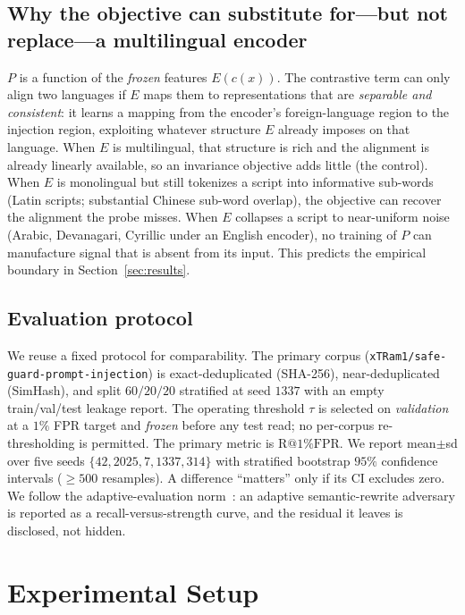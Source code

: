 \documentclass[pdflatex,sn-mathphys-num]{sn-jnl}
\makeatletter
\newcommand{\Rfpr}{\textrm{R@1\%FPR}}
\newcommand{\canon}{c}
\theoremstyle{plain}
\makeatother
\begin{document}
\subsection{Why the objective can substitute for---but not replace---a multilingual
encoder}\label{sec:method-boundary}
$P$ is a function of the \emph{frozen} features $E(\canon(x))$. The contrastive term
can only align two languages if $E$ maps them to representations that are
\emph{separable and consistent}: it learns a mapping from the encoder's
foreign-language region to the injection region, exploiting whatever structure $E$
already imposes on that language. When $E$ is multilingual, that structure is rich
and the alignment is already linearly available, so an invariance objective adds
little (the control). When $E$ is monolingual but still tokenizes a script into
informative sub-words (Latin scripts; substantial Chinese sub-word overlap), the
objective can recover the alignment the probe misses. When $E$ collapses a script to
near-uniform noise (Arabic, Devanagari, Cyrillic under an English encoder), no
training of $P$ can manufacture signal that is absent from its input. This predicts
the empirical boundary in Section~\ref{sec:results}.

\subsection{Evaluation protocol}\label{sec:protocol}
We reuse a fixed protocol for comparability. The primary corpus
(\texttt{xTRam1/safe-guard-prompt-injection}) is exact-deduplicated (SHA-256),
near-deduplicated (SimHash), and split $60/20/20$ stratified at seed $1337$ with an
empty train/val/test leakage report. The operating threshold $\tau$ is selected on
\emph{validation} at a $1\%$ FPR target and \emph{frozen} before any test read; no
per-corpus re-thresholding is permitted. The primary metric is $\Rfpr$. We report
mean$\pm$sd over five seeds $\{42,2025,7,1337,314\}$ with stratified bootstrap $95\%$
confidence intervals ($\ge\!500$ resamples). A difference ``matters'' only if its CI
excludes zero. We follow the adaptive-evaluation
norm~\cite{carlini2019eval,attackersecond2025}: an adaptive semantic-rewrite
adversary is reported as a recall-versus-strength curve, and the residual it leaves
is disclosed, not hidden.

\section{Experimental Setup}\label{sec:setup}
\end{document}
